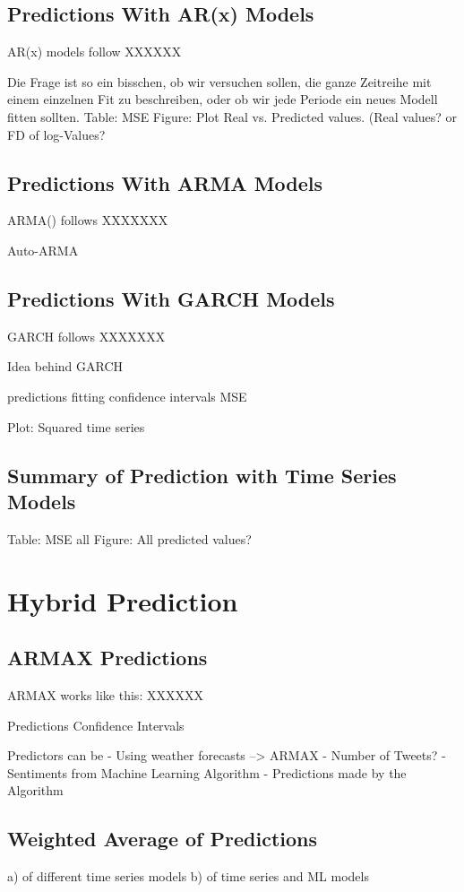 \subsection{Predictions With AR(x) Models}
AR(x) models follow
XXXXXX

Die Frage ist so ein bisschen, ob wir versuchen sollen, die ganze Zeitreihe mit einem einzelnen Fit zu beschreiben, oder ob wir jede Periode ein neues Modell fitten sollten. 
Table: MSE
Figure: Plot Real vs. Predicted values. (Real values? or FD of log-Values?

\subsection{Predictions With ARMA Models}
ARMA() follows
XXXXXXX


Auto-ARMA


\subsection{Predictions With GARCH Models}
GARCH follows 
XXXXXXX

Idea behind GARCH

predictions
fitting
confidence intervals
MSE

Plot: Squared time series



\subsection{Summary of Prediction with Time Series Models}
Table: MSE all
Figure: All predicted values?


\section{Hybrid Prediction}

\subsection{ARMAX Predictions}
ARMAX works like this: 
XXXXXX

Predictions
Confidence Intervals


Predictors can be 
- Using weather forecasts --> ARMAX
- Number of Tweets?
- Sentiments from Machine Learning Algorithm
- Predictions made by the Algorithm



\subsection{Weighted Average of Predictions}
a) of different time series models
b) of time series and ML models